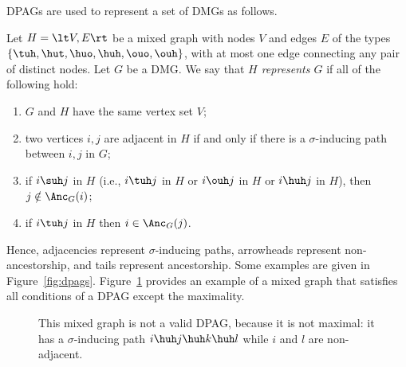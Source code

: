 DPAGs are used to represent a set of DMGs as follows.
\begin{Def}\label{def:dpag_represents_dmg}
  Let $H = \lt V,E\rt$ be a mixed graph with nodes $V$ and edges $E$ of the types $\{\tuh,\hut,\huo,\huh,\ouo,\ouh\}$, with at most one edge connecting any pair of distinct nodes.
  Let $G$ be a DMG.
  We say that \emph{$H$ represents $G$} if all of the following hold:
  \begin{enumerate}
    \item $G$ and $H$ have the same vertex set $V$;
    \item two vertices $i,j$ are adjacent in $H$ if and only if there is a $\sigma$-inducing path between $i,j$ in $G$;
    \item if $i \suh j$ in $H$ (i.e., $i \tuh j$ in $H$ or $i \ouh j$ in $H$ or $i \huh j$ in $H$), then $j \notin \Anc_{G}(i)$;
    \item if $i \tuh j$ in $H$ then $i \in \Anc_{G}(j)$.
  \end{enumerate}
\end{Def}
Hence, adjacencies represent $\sigma$-inducing paths, arrowheads represent non-ancestorship, and tails represent ancestorship.
Some examples are given in Figure~\ref{fig:dpags}. 
Figure~\ref{fig:nonmaximal_ancestral_graph} provides an example of a mixed graph that satisfies all conditions of a DPAG except the maximality.

\begin{figure}\centering
  \caption{This mixed graph is not a valid DPAG, because it is not maximal: 
  it has a $\sigma$-inducing path $i \huh j \huh  k \huh l$ while $i$ and $l$ are non-adjacent.\label{fig:nonmaximal_ancestral_graph}}
\end{figure}

